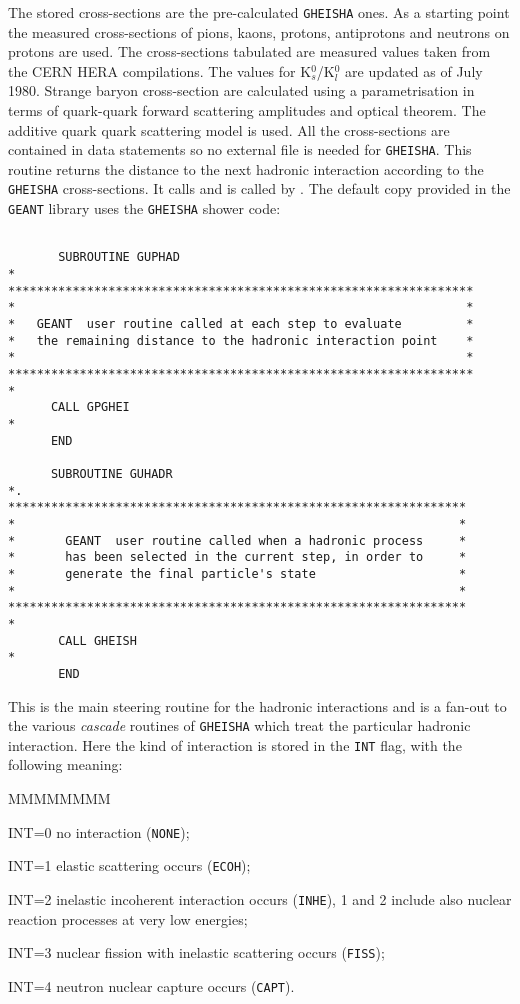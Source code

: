 The stored cross-sections are the pre-calculated {\tt GHEISHA} ones.
As a starting point the measured cross-sections of pions, kaons,
protons, antiprotons and neutrons on protons are used. The cross-sections
tabulated are measured values taken from the CERN HERA compilations. The
values for K$^{0}_{s}$/K$^{0}_{l}$ are updated as of July 1980. 
Strange baryon cross-section
are calculated using a parametrisation in terms of quark-quark forward
scattering amplitudes and optical theorem. The additive quark quark scattering
model is used.
All the cross-sections are contained in data statements so no
external file is needed for {\tt GHEISHA}.
This routine returns the distance to the next hadronic interaction
according to the {\tt GHEISHA} cross-sections. It calls 
and is called by . The default copy provided in
the {\tt GEANT} library uses the {\tt GHEISHA} shower code:
\begin{verbatim}

       SUBROUTINE GUPHAD
* 
*****************************************************************
*                                                               *
*   GEANT  user routine called at each step to evaluate         *
*   the remaining distance to the hadronic interaction point    *
*                                                               *
*****************************************************************
*
      CALL GPGHEI
*
      END

      SUBROUTINE GUHADR
*.
****************************************************************
*                                                              *
*       GEANT  user routine called when a hadronic process     *
*       has been selected in the current step, in order to     *
*       generate the final particle's state                    *
*                                                              *
****************************************************************
* 
       CALL GHEISH
*
       END
\end{verbatim}

This is the main steering routine for the hadronic interactions and is
a fan-out to the various {\it cascade} routines of
{\tt GHEISHA} which treat the particular hadronic interaction. Here the kind
of interaction is stored in the {\tt INT}
flag, with the following meaning:
\begin{DLtt}{MMMMMMMM}
\item[INT=0] no interaction            ({\tt NONE});
\item[INT=1] elastic scattering occurs ({\tt ECOH});
\item[INT=2] inelastic incoherent interaction occurs ({\tt INHE}),
    1 and 2 include also nuclear reaction processes at very low energies;
\item[INT=3] nuclear fission with inelastic scattering occurs ({\tt FISS});
\item[INT=4] neutron nuclear capture occurs ({\tt CAPT}).
\end{DLtt}

